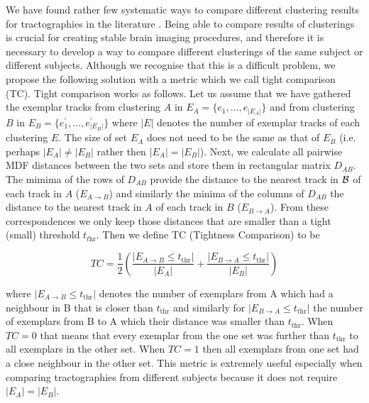 \documentclass[preprint,authoryear,a4paper,10pt,onecolumn]{elsarticle}
\begin{document}
We have found rather few systematic ways to compare different clustering
results for tractographies in the literature\textbf{
}\cite{moberts2005evaluation}.  Being able to compare results of
clusterings is crucial for creating stable brain imaging procedures, and
therefore it is necessary to develop a way to compare different
clusterings of the same subject or different subjects. Although we
recognise that this is a difficult problem, we propose the following
solution with a metric which we call tight comparison (TC). Tight
comparison works as follows. Let us assume that we have gathered the
exemplar tracks from clustering $A$ in $E_{A}=\{e_{1},...,e_{|E_{A}|}\}$
and from clustering $B$ in $E_{B}=\{e_{1}^{'},...,e_{|E_{B}|}^{'}\}$
where $|E|$ denotes the number of exemplar tracks of each clustering
$E$. The size of set $E_{A}$ does not need to be the same as that of
$E_{B}$ (i.e.  perhaps $|E_{A}|\neq|E_{B}|$ rather then
$|E_{A}|=|E_{B}|$). Next, we calculate all pairwise MDF distances
between the two sets and store them in rectangular matrix $D_{AB}$. The
mimima of the rows of $D_{AB}$ provide the distance to the nearest track
in ${\cal B}$ of each track in $A$ ($E_{A\rightarrow B}$) and similarly
the minima of the columns of $D_{AB}$ the distance to the nearest track
in $A$ of each track in $B$ ($E_{B\rightarrow A}$). From these
correspondences we only keep those distances that are smaller than a
tight (small) threshold $t_{t\textrm{hr}}$. Then we define TC (Tightness
Comparison) to be

\begin{equation}
TC=\frac{1}{2}\left(\frac{|E_{A\rightarrow B}\leq t_{\textrm{thr}}|}{|E_{A}|}+\frac{|E_{B\rightarrow A}\leq t_{\textrm{thr}}|}{|E_{B}|}\right)\end{equation}


where $|E_{A\rightarrow B}\leq t_{\textrm{thr}}|$ denotes the number of
exemplars from A which had a neighbour in B that is closer than
$t_{\textrm{thr}}$ and similarly for $|E_{B\rightarrow A}\leq
t_{\textrm{thr}}|$ the number of exemplars from B to A which their
distance was smaller than $t_{\textrm{thr}}$. When $TC=0$ that means
that every exemplar from the one set was further than $t_{\textrm{thr}}$
to all exemplars in the other set. When $TC=1$ then all exemplars from
one set had a close neighbour in the other set. This metric is extremely
useful especially when comparing tractographies from different subjects
because it does not require $|E_{A}|=|E_{B}|$.
\end{document}
